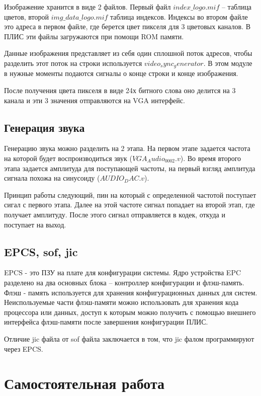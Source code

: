 \documentclass[a4paper,14pt]{article}
\begin{document}
		Изображение хранится в виде 2 файлов.
		Первый файл $index\_logo.mif$ -- таблица цветов, второй $img\_data\_logo.mif$ таблица индексов.
		Индексы во втором файле это адреса в первом файле, где берется цвет пикселя для 3 цветовых каналов.
		В ПЛИС эти файлы загружаются при помощи ROM памяти.
		
		Данные изображения представляет из себя один сплошной поток адресов, чтобы разделить этот поток на строки используется $video_sync_generator$.
		В этом модуле в нужные моменты подаются сигналы о конце строки и конце изображения.
		
		После получения цвета пикселя в виде 24х битного слова оно делится на 3 канала и эти 3 значения отправляются на VGA интерфейс.
		
	\subsection{Генерация звука}
	
		Генерацию звука можно разделить на 2 этапа.
		На первом этапе задается частота на которой будет воспроизводиться звук ($VGA_Audio_0002.v$).
		Во время второго этапа задается амплитуда для поступающей частоты, на первый взгляд амплитуда сигнала похожа на синусоиду ($AUDIO_DAC.v$).
		
		Принцип работы следующий, пин на который с определенной частотой поступает сигал с первого этапа. 
		Далее на этой частоте сигнал попадает на второй этап, где получает амплитуду.
		После этого сигнал отправляется в кодек, откуда и поступает на выход.
		
	\subsection{EPCS, sof, jic}
		
		EPCS - это ПЗУ на плате для конфигурации системы.
		Ядро устройства EPC разделено на два основных блока -- контроллер конфигурации и флэш-память. 
		Флэш - память используется для хранения конфигурационных данных для систем.
		Неиспользуемые части флэш-памяти можно использовать для хранения кода процессора или данных, доступ к которым можно получить с помощью внешнего интерфейса флэш-памяти после завершения конфигурации ПЛИС.
		
		Отличие jic файла от sof файла заключается в том, что jic фалом программируют через EPCS.  
	

	\section{Самостоятельная работа}
	
\end{document}
